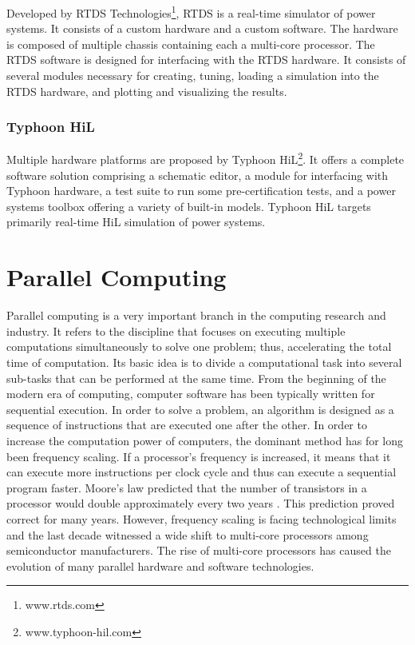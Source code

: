 Developed by RTDS Technologies\footnote{www.rtds.com}, RTDS is a real-time simulator of power systems. It consists of a custom hardware and a custom software. The hardware is composed of multiple chassis containing each a multi-core processor. The RTDS software is designed for interfacing with the RTDS hardware. It consists of several modules necessary for creating, tuning, loading a simulation into the RTDS hardware, and plotting and visualizing the results.

\subsubsection{Typhoon HiL}

Multiple hardware platforms are proposed by Typhoon HiL\footnote{www.typhoon-hil.com}. It offers a complete software solution comprising a schematic editor, a module for interfacing with Typhoon hardware, a test suite to run some pre-certification tests, and a power systems toolbox offering a variety of built-in models. Typhoon HiL targets primarily real-time HiL simulation of power systems. 


\section{Parallel Computing}

Parallel computing is a very important branch in the computing research and industry. It refers to the discipline that focuses on executing multiple computations simultaneously to solve one problem; thus, accelerating the total time of computation. Its basic idea is to divide a computational task into several sub-tasks that can be performed at the same time. From the beginning of the modern era of computing, computer software has been typically written for sequential execution. In order to solve a problem, an algorithm is designed as a sequence of instructions that are executed one after the other. In order to increase the computation power of computers, the dominant method has for long been frequency scaling. If a processor's frequency is increased, it means that it can execute more instructions per clock cycle and thus can execute a sequential program faster. Moore's law predicted that the number of transistors in a processor would double approximately every two years \cite{moore:1965}. This prediction proved correct for many years. However, frequency scaling is facing technological limits and the last decade witnessed a wide shift to multi-core processors among semiconductor manufacturers. %
The rise of multi-core processors has caused the evolution of many parallel hardware and software technologies.

